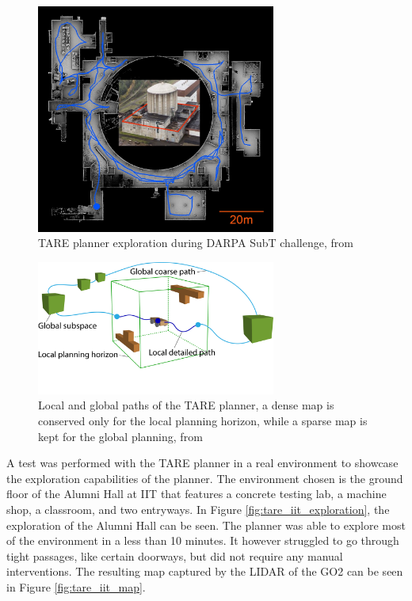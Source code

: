 \documentclass[12pt]{article}
\begin{document}
        \begin{figure}[H]
            \centering
            \includegraphics[width=0.7\textwidth]{Images/tare_darpa_exploration.jpg}
            \caption{TARE planner exploration during DARPA SubT challenge, from \cite{tare}}
            \label{fig:tare_darpa_exploration}
        \end{figure}

        \begin{figure}[H]
            \centering
            \includegraphics[width=0.7\textwidth]{Images/tare.pdf}
            \caption{Local and global paths of the TARE planner, a dense map is conserved only for the local planning horizon, while a sparse map is kept for the global planning, from \cite{tare}}
            \label{fig:tare_local_global}
        \end{figure}


        A test was performed with the TARE planner in a real environment to showcase the exploration capabilities of the planner. The environment chosen is the ground floor of the Alumni Hall at IIT that features a concrete testing lab, a machine shop, a classroom, and two entryways. In Figure \ref{fig:tare_iit_exploration}, the exploration of the Alumni Hall can be seen. The planner was able to explore most of the environment in a less than 10 minutes. It however struggled to go through tight passages, like certain doorways, but did not require any manual interventions. The resulting map captured by the LIDAR of the GO2 can be seen in Figure \ref{fig:tare_iit_map}.
\end{document}
